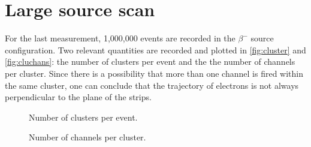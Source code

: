 \section{Large source scan}

For the last measurement, 1,000,000 events are recorded in the $\beta^{-}$ source configuration. Two relevant quantities are recorded and plotted in \autoref{fig:cluster} and \autoref{fig:cluchans}: the number of clusters per event and the the number of channels per cluster. Since there is a possibility that more than one channel is fired within the same cluster, one can conclude that the trajectory of electrons is not always perpendicular to the plane of the strips.
\begin{figure}[H]
	\centering
	\caption{Number of clusters per event.}
	\label{fig:cluster}
\end{figure}

\begin{figure}[H]
	\centering
	\caption{Number of channels per cluster.}
	\label{fig:cluchans}
\end{figure}

